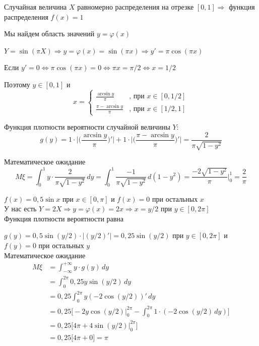 \begin{exercise}[8]
	Случайная величина $X$ равномерно распределения на отрезке $[0, 1] \Rightarrow$ функция распределения $f(x)=1$
	
	Мы найдем область значений $y=\varphi(x)$
	
	$Y=\sin(\pi X) \Rightarrow y = \varphi(x) = \sin(\pi x) \Rightarrow y' = \pi\cos(\pi x)$
	
	Если $y'=0 \Leftrightarrow \pi\cos(\pi x)=0 \Leftrightarrow \pi x = \pi/2 \Leftrightarrow x = 1/2$
	

	Поэтому $y \in [0,1]$ и 
	\[
	x = \begin{cases}
		\frac{\arcsin y}{\pi} & \text{, при } x \in [0,1/2] \\ \frac{\pi - \arcsin y}{\pi} & \text{, при } x \in [1/2, 1] 
	\end{cases}
	\]
	
	Функция плотности вероятности случайной величины $Y$:
	$$g(y) = 1 \cdot \Big|\Big(\frac{\arcsin y}{\pi}\Big)'\Big| + 1 \cdot \Big|\Big(\frac{\pi - \arcsin y}{\pi}\Big)'\Big| = \frac{2}{\pi \sqrt{1-y^2}}$$
	
	Математическое ожидание
	$$M\xi = \int_{0}^{1}y \cdot \frac{2}{\pi \sqrt{1-y^2}} \,dy = \int_{0}^{1} \frac{-1}{\pi \sqrt{1-y^2}}\,d(1-y^2) = \frac{-2\sqrt{1-y^2}}{\pi}\Big|^1_0 = \frac{2}{\pi}$$
\end{exercise}

\begin{exercise}[9]
	$f(x)=0,5\sin x$ при $x \in [0, \pi]$ и $f(x)=0$ при остальных $x$ \\ У нас есть $Y = 2X \Rightarrow y = \varphi(x) = 2x \Rightarrow x = y/2$ при $y \in [0, 2\pi]$ \\ Функция плотности вероятности равна
	
	$g(y) = 0,5\sin (y/2) \cdot \Big|(y/2)'\Big|=0,25 \sin(y/2)$ при $y \in [0, 2\pi]$ и $f(y)=0$ при остальных $y$ \\ Математическое ожидание 
	\begin{align*}
		M\xi & = \int_{-\infty}^{+\infty}y \cdot g(y)\,dy \\ & = \int_{0}^{2\pi} 0,25 y\sin(y/2)\,dy \\ & = 0,25\int_{0}^{2\pi}y (-2\cos(y/2))' \,dy \\ & = 0,25 \Big[-2y\cos(y/2)\Big|^{2\pi}_0 - \int_{0}^{2\pi}1 \cdot (-2\cos(y/2)\,dy)\Big] \\ & = 0,25\Big[4\pi + 4\sin(y/2)\Big|^{2\pi}_0\Big] \\ & = 0,25\Big[4\pi + 0\Big] = \pi
	\end{align*}
\end{exercise}

